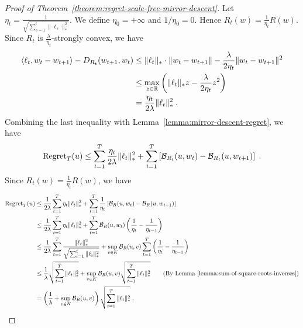 \begin{proof}[Proof of Theorem~\ref{theorem:regret-scale-free-mirror-descent}]
Let $\eta_t = \frac{1}{\sqrt{\sum_{s=1}^t \|\ell_s\|_*^2}}$. We define $\eta_0 = +\infty$ and $1/\eta_0 = 0$.
Hence $R_t(w) = \frac{1}{\eta_t} R(w)$.
Since $R_t$ is $\frac{\lambda}{\eta_t}$-strongly convex, we have
\begin{align*}
\langle \ell_t, w_t - w_{t+1} \rangle - D_{R_t}(w_{t+1}, w_t)
& \le \|\ell_t\|_* \cdot \|w_t - w_{t+1}\| - \frac{\lambda}{2\eta_t} \|w_t - w_{t+1} \|^2 \\
& \le \max_{z \in \mathbb{R}} \left( \|\ell_t\|_* z - \frac{\lambda}{2 \eta_t} z^2 \right) \\
& = \frac{\eta_t}{2\lambda} \|\ell_t\|_*^2 \; .
\end{align*}
Combining the last inequality with Lemma~\ref{lemma:mirror-descent-regret}, we have
$$
\operatorname{Regret}_T(u) \le \sum_{t=1}^T \frac{\eta_t}{2\lambda} \|\ell_t\|_*^2 + \sum_{t=1}^T \left[ \mathcal{B}_{R_t}(u,w_t) - \mathcal{B}_{R_t}(u, w_{t+1}) \right] \; .
$$
Since $R_t(w) = \frac{1}{\eta_t} R(w)$, we have
\begin{align*}
\operatorname{Regret}_T(u)
& \le \frac{1}{2\lambda} \sum_{t=1}^T \eta_t \|\ell_t\|_*^2 + \sum_{t=1}^T \frac{1}{\eta_t} \left[\mathcal{B}_R(u, w_t) - \mathcal{B}_R(u, w_{t+1})\right] \\
& \le \frac{1}{2\lambda} \sum_{t=1}^T \eta_t \|\ell_t\|_*^2 + \sum_{t=1}^T \mathcal{B}_R(u, w_t) \left( \frac{1}{\eta_t} - \frac{1}{\eta_{t-1}} \right) \\
& \le \frac{1}{2\lambda} \sum_{t=1}^T \frac{\|\ell_t\|_*^2}{\sqrt{\sum_{i=1}^t \|\ell_i\|_*^2}} + \sup_{v \in K} \mathcal{B}_R(u,v) \sum_{t=1}^T \left( \frac{1}{\eta_t} - \frac{1}{\eta_{t-1}} \right) \\
& \le \frac{1}{\lambda} \sqrt{\sum_{t=1}^T \|\ell_t\|_*^2} + \sup_{v \in K} \mathcal{B}_R(u,v) \sqrt{\sum_{t=1}^T \|\ell_t\|_*^2} \qquad \text{(By Lemma~\ref{lemma:sum-of-square-roots-inverses})} \\
& = \left( \frac{1}{\lambda} + \sup_{v \in K} \mathcal{B}_R(u,v) \right) \sqrt{\sum_{t=1}^T \|\ell_t\|_*^2} \; .
\end{align*}
\end{proof}

